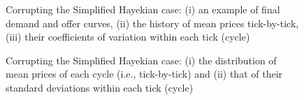\documentclass[10pt]{report}
\begin{document}
\begin{appendices}
\begin{figure}[H]
\begin{center}
\caption{Corrupting the Simplified Hayekian case: (i) an example of final demand and offer curves, (ii) the history of mean prices tick-by-tick, (iii) their coefficients of variation within each tick (cycle)}
\label{output_3_2B1.png}
\end{center}
\end{figure}

\begin{figure}[H]
\begin{center}
\caption{Corrupting the Simplified Hayekian case: (i) the distribution of mean prices of each cycle (i.e., tick-by-tick) and (ii) that of their standard deviations within each tick (cycle)}
\label{output_3_3B1.png}
\end{center}
\end{figure}






\end{appendices}
\end{document}
